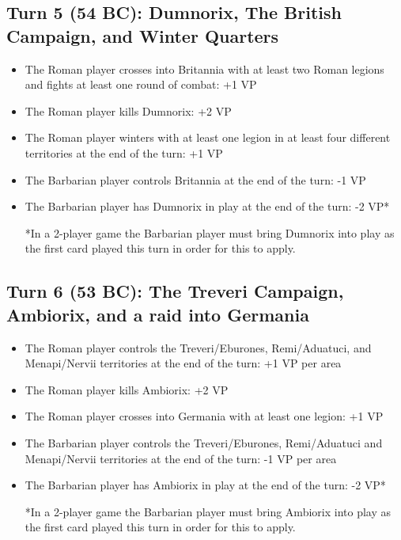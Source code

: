 \subsection{Turn 5 (54 BC): Dumnorix, The British Campaign, and Winter Quarters}
\begin{itemize}
  \setlength\itemsep{0em}
  \item The Roman player crosses into Britannia with at least two Roman legions and fights at least one round of combat: +1 VP
  \item The Roman player kills Dumnorix: +2 VP
  \item The Roman player winters with at least one legion in at least four different territories at the end of the turn: +1 VP
  \item The Barbarian player controls Britannia at the end of the turn: -1 VP
  \item The Barbarian player has Dumnorix in play at the end of the turn: -2 VP*
  
*In a 2-player game the Barbarian player must bring Dumnorix into play as the first card played this turn in order for this to apply.
\end{itemize}

\subsection{Turn 6 (53 BC): The Treveri Campaign, Ambiorix, and a raid into Germania}
\begin{itemize}
  \setlength\itemsep{0em}
  \item The Roman player controls the Treveri/Eburones, Remi/Aduatuci, and Menapi/Nervii territories at the end of the turn: +1 VP per area
  \item The Roman player kills Ambiorix: +2 VP
  \item The Roman player crosses into Germania with at least one legion: +1 VP
  \item The Barbarian player controls the Treveri/Eburones, Remi/Aduatuci and Menapi/Nervii territories at the end of the turn: -1 VP per area
  \item The Barbarian player has Ambiorix in play at the end of the turn: -2 VP*
  
*In a 2-player game the Barbarian player must bring Ambiorix into play as the first card played this turn in order for this to apply.
\end{itemize}

